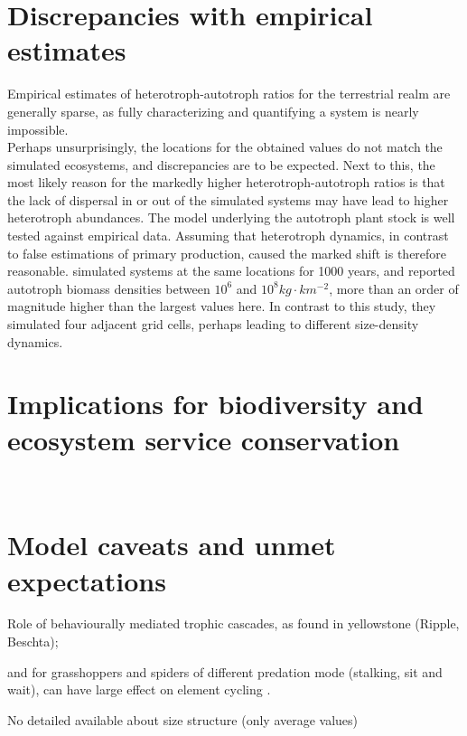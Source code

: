 \section{Discrepancies with empirical estimates}
Empirical estimates of heterotroph-autotroph ratios for the terrestrial realm are generally sparse, as fully characterizing and quantifying a system is nearly impossible.\\ 
Perhaps unsurprisingly, the locations for the obtained values do not match the simulated ecosystems, and discrepancies are to be expected. Next to this, the most likely reason for the markedly higher heterotroph-autotroph ratios is that the lack of dispersal in or out of the simulated systems may have lead to higher heterotroph abundances. The model \citep{Smith2012} underlying the autotroph plant stock is well tested against empirical data. Assuming that heterotroph dynamics, in contrast to false estimations of primary production, caused the marked shift is therefore reasonable. \cite{Harfoot2014} simulated systems at the same locations for 1000 years, and reported autotroph biomass densities between $10^{6}$ and $10^{8} kg\cdot km^{-2}$, more than an order of magnitude higher than the largest values here. In contrast to this study, they simulated four adjacent grid cells, perhaps leading to different size-density dynamics.


\section{Implications for biodiversity and ecosystem service conservation }

%
\\

\section{Model caveats and unmet expectations}
Role of behaviourally mediated trophic cascades,  as found in yellowstone (Ripple, Beschta);

 and for grasshoppers and spiders of different predation mode (stalking, sit and wait), can have large effect on element cycling \cite{Schmitz2015}.
 
No detailed available about size structure (only average values)